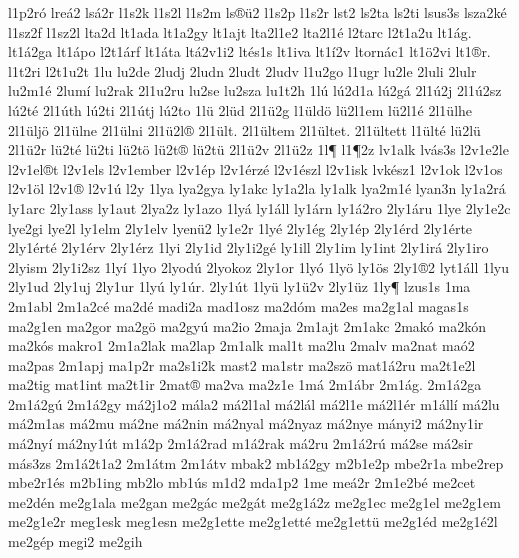 {l1p2r^^f3
lre^^e12
ls^^e12r
l1s2k
l1s2l
l1s2m
ls^^ae^^fc2
l1s2p
l1s2r
lst2
ls2ta
ls2ti
lsus3s
lsza2k^^e9
l1sz2f
l1sz2l
lta2d
lt1ada
lt1a2gy
lt1ajt
lta2l1e2
lta2l1^^e9
l2tarc
l2t1a2u
lt1^^e1g.
lt1^^e12ga
lt1^^e1po
l2t1^^e1rf
lt1^^e1ta
lt^^e12v1i2
lt^^e9s1s
lt1iva
lt1^^ed2v
ltorn^^e1c1
lt1^^f62vi
lt1^^aer.
l1t2ri
l2t1u2t
1lu
lu2de
2ludj
2ludn
2ludt
2ludv
l1u2go
l1ugr
lu2le
2luli
2lulr
lu2m1^^e9
2lum^^ed
lu2rak
2l1u2ru
lu2se
lu2sza
lu1t2h
1l^^fa
l^^fa2d1a
l^^fa2g^^e1
2l1^^fa2j
2l1^^fa2sz
l^^fa2t^^e9
2l1^^fath
l^^fa2ti
2l1^^fatj
l^^fa2to
1l^^fc
2l^^fcd
2l1^^fc2g
l1^^fcld^^f6
l^^fc2l1em
l^^fc2l1^^e9
2l1^^fclhe
2l1^^fclj^^f6
2l1^^fclne
2l1^^fclni
2l1^^fc2l^^ae
2l1^^fclt.
2l1^^fcltem
2l1^^fcltet.
2l1^^fcltett
l1^^fclt^^e9
l^^fc2l^^fc
2l1^^fc2r
l^^fc2t^^e9
l^^fc2ti
l^^fc2t^^f6
l^^fc2t^^ae
l^^fc2t^^fc
2l1^^fc2v
2l1^^fc2z
1l^^b6
l1^^b62z
lv1alk
lv^^e1s3s
l2v1e2le
l2v1el^^aet
l2v1els
l2v1ember
l2v1^^e9p
l2v1^^e9rz^^e9
l2v1^^e9szl
l2v1isk
lvk^^e9sz1
l2v1ok
l2v1os
l2v1^^f6l
l2v1^^ae
l2v1^^fa
l2y
1lya
lya2gya
ly1akc
ly1a2la
ly1alk
lya2m1^^e9
lyan3n
ly1a2r^^e1
ly1arc
2ly1ass
ly1aut
2lya2z
ly1azo
1ly^^e1
ly1^^e1ll
ly1^^e1rn
ly1^^e12ro
2ly1^^e1ru
1lye
2ly1e2c
lye2gi
lye2l
ly1elm
2ly1elv
lyen^^fc2
ly1e2r
1ly^^e9
2ly1^^e9g
2ly1^^e9p
2ly1^^e9rd
2ly1^^e9rte
2ly1^^e9rt^^e9
2ly1^^e9rv
2ly1^^e9rz
1lyi
2ly1id
2ly1i2g^^e9
ly1ill
2ly1im
ly1int
2ly1ir^^e1
2ly1iro
2lyism
2ly1i2sz
1ly^^ed
1lyo
2lyod^^fa
2lyokoz
2ly1or
1ly^^f3
1ly^^f6
ly1^^f6s
2ly1^^ae2
lyt1^^e1ll
1lyu
2ly1ud
2ly1uj
2ly1ur
1ly^^fa
ly1^^far.
2ly1^^fat
1ly^^fc
ly1^^fc2v
2ly1^^fcz
1ly^^b6
lzus1s
1ma
2m1abl
2m1a2c^^e9
ma2d^^e9
madi2a
mad1osz
ma2d^^f3m
ma2es
ma2g1al
magas1s
ma2g1en
ma2gor
ma2g^^f6
ma2gy^^fa
ma2io
2maja
2m1ajt
2m1akc
2mak^^f3
ma2k^^f3n
ma2k^^f3s
makro1
2m1a2lak
ma2lap
2m1alk
mal1t
ma2lu
2malv
ma2nat
ma^^f32
ma2pas
2m1apj
ma1p2r
ma2s1i2k
mast2
ma1str
ma2sz^^f6
mat1^^e12ru
ma2t1e2l
ma2tig
mat1int
ma2t1ir
2mat^^ae
ma2va
ma2z1e
1m^^e1
2m1^^e1br
2m1^^e1g.
2m1^^e12ga
2m1^^e12g^^fa
2m1^^e12gy
m^^e12j1o2
m^^e1la2
m^^e12l1al
m^^e12l^^e1l
m^^e12l1e
m^^e12l1^^e9r
m1^^e1ll^^ed
m^^e12lu
m^^e12m1as
m^^e12mu
m^^e12ne
m^^e12nin
m^^e12nyal
m^^e12nyaz
m^^e12nye
m^^e1nyi2
m^^e12ny1ir
m^^e12ny^^ed
m^^e12ny1^^fat
m1^^e12p
2m1^^e12rad
m1^^e12rak
m^^e12ru
2m1^^e12r^^fa
m^^e12se
m^^e12sir
m^^e1s3zs
2m1^^e12t1a2
2m1^^e1tm
2m1^^e1tv
mbak2
mb1^^e12gy
m2b1e2p
mbe2r1a
mbe2rep
mbe2r1^^e9s
m2b1ing
mb2lo
mb1^^fas
m1d2
mda1p2
1me
me^^e12r
2m1e2b^^e9
me2cet
me2d^^e9n
me2g1ala
me2gan
me2g^^e1c
me2g^^e1t
me2g1^^e12z
me2g1ec
me2g1el
me2g1em
me2g1e2r
meg1esk
meg1esn
me2g1ette
me2g1ett^^e9
me2g1ett^^fc
me2g1^^e9d
me2g1^^e92l
me2g^^e9p
megi2
me2gih
}
